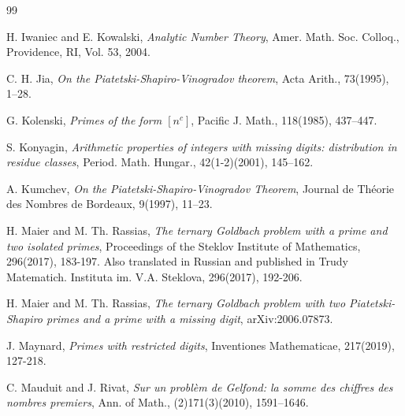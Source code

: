\documentclass{amsart}
\numberwithin{equation}{subsection}
\begin{document}
\begin{thebibliography}{99}




\; H. Iwaniec and E. Kowalski, \textit{Analytic Number Theory}, Amer. Math. Soc. Colloq., Providence, RI, Vol. 53, 2004.


 C. H. Jia, \textit{On the Piatetski-Shapiro-Vinogradov theorem}, Acta Arith., 73(1995), 1--28.

 G. Kolenski, \textit{Primes of the form $[n^c]$}, Pacific J. Math., 118(1985), 437--447.

 S. Konyagin, \textit{Arithmetic properties of integers with missing digits: distribution in residue classes}, Period. Math. Hungar., 42(1-2)(2001), 145--162.

 A. Kumchev, \textit{On the Piatetski-Shapiro-Vinogradov Theorem}, Journal de Th\'eorie des Nombres de Bordeaux, 9(1997), 11--23.



 H. Maier and M. Th. Rassias, \textit{The ternary Goldbach problem with a prime and two isolated primes}, Proceedings of the Steklov Institute of Mathematics, 296(2017), 183-197. Also translated in Russian and published in Trudy Matematich. Instituta im. V.A. Steklova, 296(2017), 192-206.

 H. Maier and M. Th. Rassias, \textit{The ternary Goldbach problem with two Piatetski-Shapiro primes and a prime with a missing digit}, arXiv:2006.07873.


 J. Maynard, \textit{Primes with restricted digits}, Inventiones Mathematicae, 217(2019), 127-218. 

 C. Mauduit and J. Rivat, \textit{Sur un probl\`{e}m de Gelfond: la somme des chiffres des nombres premiers}, Ann. of Math., (2)171(3)(2010), 1591--1646.


\end{thebibliography}
\end{document}
